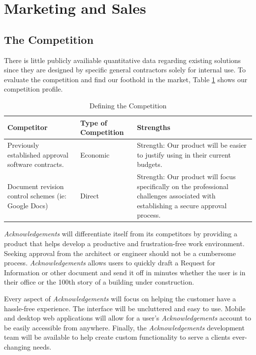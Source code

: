 \section{Marketing and Sales}

\subsection{The Competition}
There is little publicly availiable quantitative data regarding existing solutions since they are designed by specific general contractors solely for internal use. To evaluate the competition and find our foothold in the market, Table \ref{competition} shows our competition profile.

\begin{table}[ht]
	\caption{Defining the Competition} %
	\centering %
	\begin{tabular}{| p{2in} | p{1in} | p{2in} |} %
		\hline
		{\bf Competitor} & {\bf Type of Competition} & {\bf Strengths} \\ \hline
		Previously established approval software contracts. & Economic & Strength: Our product will be easier to justify using in their current budgets.\\ \hline %
		Document revision control schemes (ie: Google Docs) & Direct & Strength: Our product will focus specifically on the professional challenges associated with establishing a secure approval process. \\ \hline
	\end{tabular}
	\label{competition} %
\end{table}

{\it Acknowledgements} will differentiate itself from its competitors by providing a product that helps develop a productive and frustration-free work environment. Seeking approval from the architect or engineer should not be a cumbersome process. {\it Acknowledgements} allows users to quickly draft a Request for Information or other document and send it off in minutes whether the user is in their office or the 100th story of a building under construction. 

Every aspect of {\it Acknowledgements} will focus on helping the customer have a hassle-free experience. The interface will be uncluttered and easy to use. Mobile and desktop web applications will allow for a user's {\it Acknowledgements} account to be easily accessible from anywhere. Finally, the {\it Acknowledgements} development team will be available to help create custom functionality to serve a clients ever-changing needs.

